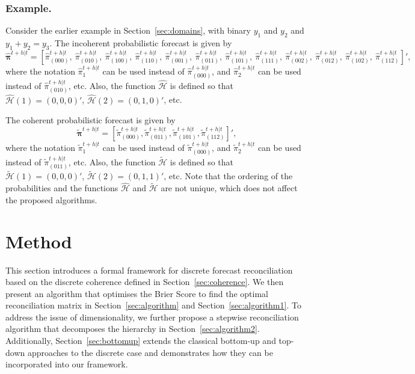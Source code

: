 \documentclass[a4paper,review,12pt,authoryear]{elsarticle}
\newcommand{\bpi}{\bm{\pi}}
\theoremstyle{definition}
\begin{document}
  \subsubsection*{\textbf{Example}.}

  Consider the earlier example in Section~\ref{sec:domains}, with binary $y_1$ and $y_2$ and $y_1+y_2=y_3$. The incoherent probabilistic forecast is given by
  \[
    \hat{\bpi}^{t+h|t}= \left[
      \hat{\pi}^{t+h|t}_{(000)}, ~
       \hat{\pi}^{t+h|t}_{(010)},~
       \hat{\pi}^{t+h|t}_{(100)},~
       \hat{\pi}^{t+h|t}_{(110)},~
       \hat{\pi}^{t+h|t}_{(001)},~
       \hat{\pi}^{t+h|t}_{(011)},~
       \hat{\pi}^{t+h|t}_{(101)},~
       \hat{\pi}^{t+h|t}_{(111)},~
       \hat{\pi}^{t+h|t}_{(002)},~
       \hat{\pi}^{t+h|t}_{(012)},~
       \hat{\pi}^{t+h|t}_{(102)},~
       \hat{\pi}^{t+h|t}_{(112)}
       \right]',
  \]
  where the notation $\hat{\pi}^{t+h|t}_{1}$ can be used instead of $\hat{\pi}^{t+h|t}_{(000)}$, and $\hat{\pi}^{t+h|t}_{2}$ can be used instead of $\hat{\pi}^{t+h|t}_{(010)}$, etc. Also, the function $\hat{\mathcal{H}}$ is defined so that $\hat{\mathcal{H}}(1)=(0,0,0)'$, $\hat{\mathcal{H}}(2)=(0,1,0)'$, etc.

  The coherent probabilistic forecast is given by
  \[
  \tilde{\bpi}^{t+h|t}=\left[
  \tilde{\pi}^{t+h|t}_{(000)},
  \tilde{\pi}^{t+h|t}_{(011)},
  \tilde{\pi}^{t+h|t}_{(101)},
  \tilde{\pi}^{t+h|t}_{(112)}
  \right]',\]
  where the notation $\tilde{\pi}^{t+h|t}_{1}$ can be used instead of $\tilde{\pi}^{t+h|t}_{(000)}$, and $\tilde{\pi}^{t+h|t}_{2}$ can be used instead of $\tilde{\pi}^{t+h|t}_{(011)}$, etc. Also, the function $\tilde{\mathcal{H}}$ is defined so that $\tilde{\mathcal{H}}(1)=(0,0,0)'$, $\tilde{\mathcal{H}}(2)=(0,1,1)'$, etc. Note that the ordering of the probabilities and the functions $\hat{\mathcal{H}}$ and $\tilde{\mathcal{H}}$ are not unique, which does not affect the proposed algorithms.

\section{Method}
\label{sec:method}

This section introduces a formal framework for discrete forecast reconciliation based on the discrete coherence defined in Section~\ref{sec:coherence}.
We then present an algorithm that optimises the Brier Score to find the optimal reconciliation matrix in Section~\ref{sec:algorithm} and Section~\ref{sec:algorithm1}.
To address the issue of dimensionality, we further propose a stepwise reconciliation algorithm that decomposes the hierarchy in Section~\ref{sec:algorithm2}.
Additionally, Section~\ref{sec:bottomup} extends the classical bottom-up and top-down approaches to the discrete case and demonstrates how they can be incorporated into our framework.
\end{document}

